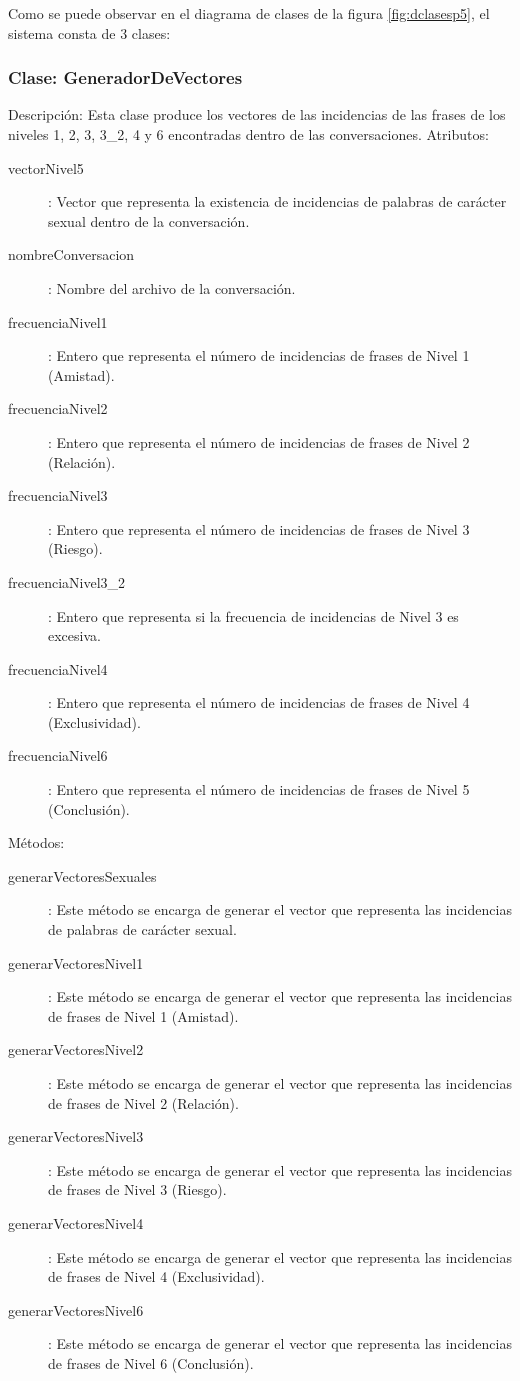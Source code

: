 Como se puede observar en el diagrama de clases de la figura \ref{fig:dclasesp5}, el sistema consta de 3 clases:


\subsubsection{Clase: GeneradorDeVectores}
Descripci\'on: Esta clase produce los vectores de las incidencias de las frases de los niveles 1, 2, 3, 3\_2, 4 y 6 encontradas dentro de las conversaciones.
Atributos: 
\begin{description}
\item[vectorNivel5]: Vector que representa la existencia de incidencias de palabras de car\'acter sexual dentro de la conversaci\'on.
\item[nombreConversacion]: Nombre del archivo de la conversaci\'on.
\item[frecuenciaNivel1]: Entero que representa el n\'umero de incidencias de frases de Nivel 1 (Amistad). 
\item[frecuenciaNivel2]: Entero que representa el n\'umero de incidencias de frases de Nivel 2 (Relaci\'on).
\item[frecuenciaNivel3]: Entero que representa el n\'umero de incidencias de frases de Nivel 3 (Riesgo).
\item[frecuenciaNivel3\_2]: Entero que representa si la frecuencia de incidencias de Nivel 3 es excesiva.
\item[frecuenciaNivel4]: Entero que representa el n\'umero de incidencias de frases de Nivel 4 (Exclusividad).
\item[frecuenciaNivel6]: Entero que representa el n\'umero de incidencias de frases de Nivel 5 (Conclusi\'on).
\end{description}

M\'etodos:
\begin{description}
\item[generarVectoresSexuales]: Este m\'etodo se encarga de generar el vector que representa las incidencias de palabras de car\'acter sexual.
\item[generarVectoresNivel1]: Este m\'etodo se encarga de generar el vector que representa las incidencias de frases de Nivel 1 (Amistad).
\item[generarVectoresNivel2]: Este m\'etodo se encarga de generar el vector que representa las incidencias de frases de Nivel 2 (Relaci\'on).
\item[generarVectoresNivel3]: Este m\'etodo se encarga de generar el vector que representa las incidencias de frases de Nivel 3 (Riesgo).
\item[generarVectoresNivel4]: Este m\'etodo se encarga de generar el vector que representa las incidencias de frases de Nivel 4 (Exclusividad).
\item[generarVectoresNivel6]: Este m\'etodo se encarga de generar el vector que representa las incidencias de frases de Nivel 6 (Conclusi\'on).
\end{description}

